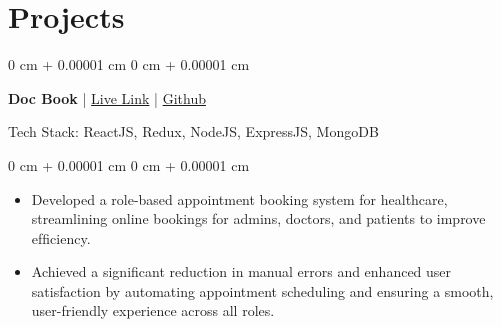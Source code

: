 \documentclass[12pt, a3paper]{article}
\newenvironment{highlights}{
    \begin{itemize}[
        topsep=0.10 cm,
        parsep=0.10 cm,
        partopsep=0pt,
        itemsep=0pt,
        leftmargin=0 cm + 10pt
    ]
}{
    \end{itemize}
} %
\newenvironment{onecolentry}{
    \begin{adjustwidth}{
        0 cm + 0.00001 cm
    }{
        0 cm + 0.00001 cm
    }
}{
    \end{adjustwidth}
} %
\newenvironment{twocolentry}[2][]{
    \onecolentry
    \def\secondColumn{#2}
    \setcolumnwidth{\fill, 4.5 cm}
    \begin{paracol}{2}
}{
    \switchcolumn \raggedleft \secondColumn
    \end{paracol}
    \endonecolentry
} %
\begin{document}
        


    \vspace{0.7 cm}

    
    \section{Projects}



        
        \begin{twocolentry}{
            
        }
            \textbf{Doc Book } | \href{https://doc-book.netlify.app/}{Live Link} | \href{https://github.com/trishaamandal/Doc-BOOK}{Github}\end{twocolentry}
            Tech Stack: ReactJS, Redux, NodeJS, ExpressJS, MongoDB

        \vspace{0.10 cm}
        \begin{onecolentry}
            \begin{highlights}
                \item Developed a role-based appointment booking system for
                healthcare, streamlining online bookings for admins,
                doctors, and patients to improve efﬁciency.
                \item Achieved a signiﬁcant reduction in manual errors and
                enhanced user satisfaction by automating appointment
                scheduling and ensuring a smooth, user-friendly
                experience across all roles.
            \end{highlights}
        \end{onecolentry}
\end{document}

